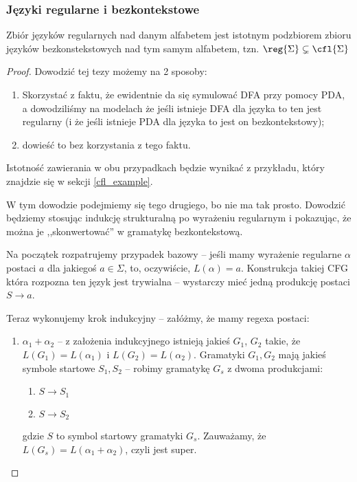 \subsubsection{Języki regularne i bezkontekstowe}

\begin{theorem}
    Zbiór języków regularnych nad danym alfabetem jest istotnym podzbiorem zbioru języków bezkonstekstowych nad tym samym alfabetem, tzn. \(\reg{\Sigma} \subsetneq  \cfl{\Sigma}\)
\end{theorem}

\begin{proof}
    Dowodzić tej tezy możemy na 2 sposoby:
    
    \begin{enumerate}
        \item Skorzystać z faktu, że ewidentnie da się symulować DFA przy pomocy PDA, a dowodziliśmy na modelach że jeśli istnieje DFA dla języka to ten jest regularny (i że jeśli istnieje PDA dla języka to jest on bezkontekstowy);
        \item dowieść to bez korzystania z tego faktu. 
    \end{enumerate}
    
    Istotność zawierania w obu przypadkach będzie wynikać z przykładu, który znajdzie się w sekcji \ref{cfl_example}.
    
    W tym dowodzie podejmiemy się tego drugiego, bo nie ma tak prosto. Dowodzić będziemy stosując indukcję strukturalną po wyrażeniu regularnym i pokazując, że można je ,,skonwertować'' w gramatykę bezkontekstową. 
    
    Na początek rozpatrujemy przypadek bazowy -- jeśli mamy wyrażenie regularne \(\alpha\) postaci \(a\) dla jakiegoś \(a \in \Sigma\), to, oczywiście, \(L(\alpha) = a\). Konstrukcja takiej CFG która rozpozna ten język jest trywialna -- wystarczy mieć jedną produkcję postaci \(S \rightarrow a\). 
    
    Teraz wykonujemy krok indukcyjny -- załóżmy, że mamy regexa postaci:
    
    \begin{enumerate}
        \item \( \alpha_1 + \alpha_2\) -- z założenia indukcyjnego istnieją jakieś \(G_1\), \(G_2\) takie, że \(L(G_1) = L(\alpha_1)\) i \(L(G_2) = L(\alpha_2)\). Gramatyki \(G_1, G_2\) mają jakieś symbole startowe \(S_1, S_2\) -- robimy gramatykę \(G_s\) z dwoma produkcjami: 
        \begin{enumerate}
            \item \(S \rightarrow S_1\)
            \item \(S \rightarrow S_2\)
        \end{enumerate}
        gdzie \(S\) to symbol startowy gramatyki \(G_s\). Zauważamy, że \(L(G_s) = L(\alpha_1 + \alpha_2)\), czyli jest super.
        

\end{enumerate}
\end{proof}
